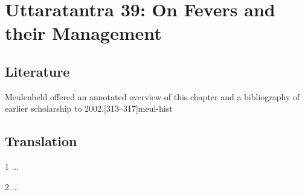 
\chapter{Uttaratantra 39:  On Fevers and their Management}

\section{Literature} 

Meulenbeld offered an annotated overview of this chapter and a bibliography
of earlier scholarship to 2002.[313--317]{meul-hist} 

\section{Translation}

\begin{translation}
    
    \item [1] ...
    
    \item [2] ...
    
\end{translation}
